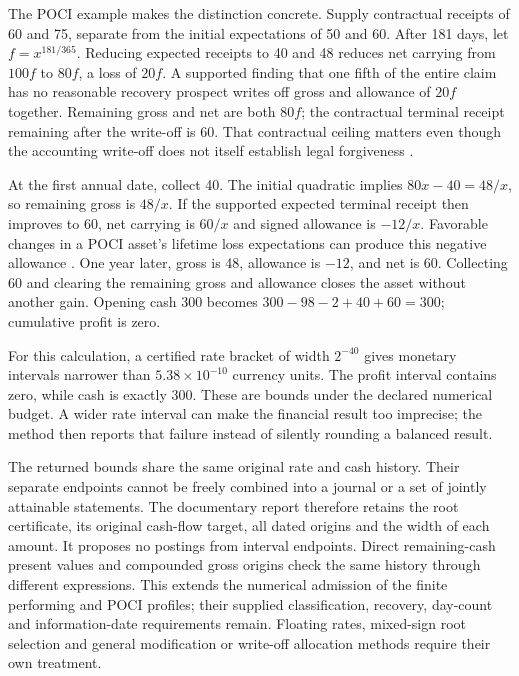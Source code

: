 The POCI example makes the distinction concrete. Supply contractual receipts
of 60 and 75, separate from the initial expectations of 50 and 60. After
181 days, let \(f=x^{181/365}\). Reducing expected receipts to 40 and 48
reduces net carrying from \(100f\) to \(80f\), a loss of \(20f\).
A supported finding that one fifth of the entire claim has no reasonable
recovery prospect writes off gross and allowance of \(20f\) together.
Remaining gross and net are both \(80f\); the contractual terminal receipt
remaining after the write-off is 60. That contractual ceiling matters even
though the accounting write-off does not itself establish legal forgiveness
\citep[IFRS~9.5.4.4,B5.4.9]{eu20231803}.

At the first annual date, collect 40. The initial quadratic implies
\(80x-40=48/x\), so remaining gross is \(48/x\). If the supported expected
terminal receipt then improves to 60, net carrying is \(60/x\) and signed
allowance is \(-12/x\). Favorable changes in a POCI asset's lifetime loss
expectations can produce this negative allowance
\citep[IFRS~9.5.5.13--14]{eu20231803}. One year later, gross is 48, allowance
is \(-12\), and net is 60. Collecting 60 and clearing the remaining gross
and allowance closes the asset without another gain. Opening cash 300 becomes
\(300-98-2+40+60=300\); cumulative profit is zero.

For this calculation, a certified rate bracket of width \(2^{-40}\) gives
monetary intervals narrower than \(5.38\times10^{-10}\) currency units.
The profit interval contains zero, while cash is exactly 300. These are
bounds under the declared numerical budget. A wider rate interval can make
the financial result too imprecise; the method then reports that failure
instead of silently rounding a balanced result.

The returned bounds share the same original rate and cash history. Their
separate endpoints cannot be freely combined into a journal or a set of
jointly attainable statements. The documentary report therefore retains the
root certificate, its original cash-flow target, all dated origins and the
width of each amount. It proposes no postings from interval endpoints.
Direct remaining-cash present values and compounded gross origins check the
same history through different expressions. This extends the numerical
admission of the finite performing and POCI profiles; their supplied
classification, recovery, day-count and information-date requirements remain.
Floating rates, mixed-sign root selection and general modification or
write-off allocation methods require their own treatment.
